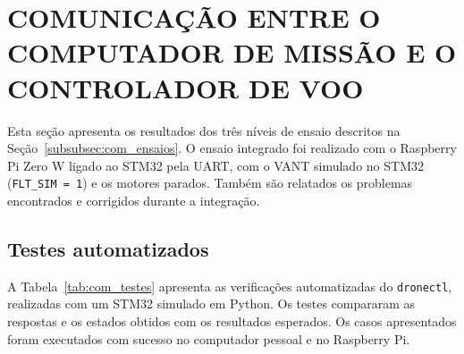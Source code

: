 
\section{COMUNICAÇÃO ENTRE O COMPUTADOR DE MISSÃO E O CONTROLADOR DE VOO}\label{sec:res_comunicacao}

Esta seção apresenta os resultados dos três níveis de ensaio descritos na Seção~\ref{subsubsec:com_ensaios}. O ensaio integrado foi realizado com o Raspberry Pi Zero W ligado ao STM32 pela UART, com o VANT simulado no STM32 (\texttt{FLT\_SIM = 1}) e os motores parados. Também são relatados os problemas encontrados e corrigidos durante a integração.

\subsection{Testes automatizados}\label{subsec:res_com_testes}

A Tabela~\ref{tab:com_testes} apresenta as verificações automatizadas do \texttt{dronectl}, realizadas com um STM32 simulado em Python. Os testes compararam as respostas e os estados obtidos com os resultados esperados. Os casos apresentados foram executados com sucesso no computador pessoal e no Raspberry Pi.

